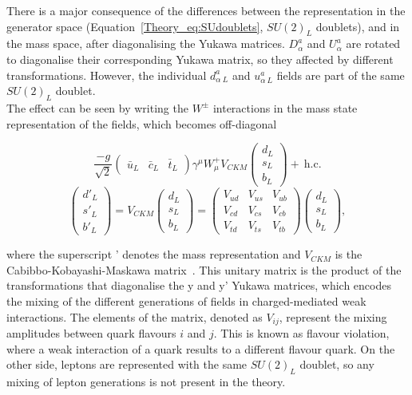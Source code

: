There is a major consequence of the differences between the representation in the generator space (Equation~\ref{Theory_eq:SUdoublets}, $SU(2)_L$ doublets), and in the mass space, after diagonalising the Yukawa matrices. $D^a_{\alpha}$ and $U^a_{\alpha}$ are rotated to diagonalise their corresponding Yukawa matrix, so they affected by different transformations. However, the individual $d^a_{\alpha\ L}$ and $u^a_{\alpha\ L}$ fields are part of the same $SU(2)_L$ doublet.\\ 

The effect can be seen by writing the $W^\pm$ interactions in the mass state representation of the fields, which becomes off-diagonal

\begin{equation}
    \frac{-g}{\sqrt{2}} \begin{pmatrix} \bar{u}_L & \bar{c}_L & \bar{t}_L \end{pmatrix} \gamma^\mu W_\mu^+ V_{CKM} \begin{pmatrix} d_L \\ s_L \\ b_L \end{pmatrix} +\ \text{h.c}.
\end{equation}
\begin{equation}
\begin{pmatrix} d'_L \\ s'_L \\ b'_L \end{pmatrix} = V_{CKM}\begin{pmatrix} d_L \\ s_L \\ b_L \end{pmatrix} =\begin{pmatrix} V_{ud} & V_{us} & V_{ub} \\ V_{cd} & V_{cs} & V_{cb} \\ V_{td} & V_{ts} & V_{tb} \end{pmatrix} \begin{pmatrix} d_L \\ s_L \\ b_L \end{pmatrix},
\end{equation}

where the superscript ' denotes the mass representation and $V_{CKM}$ is the Cabibbo-Kobayashi-Maskawa matrix~\cite{Cabibbo,KobayaMaska}. This unitary matrix is the product of the transformations that diagonalise the y and y' Yukawa matrices, which encodes the mixing of the different generations of fields in charged-mediated weak interactions. The elements of the matrix, denoted as $V_{ij}$, represent the mixing amplitudes between quark flavours $i$ and $j$. This is known as flavour violation, where a weak interaction of a quark results to a different flavour quark. %
On the other side, leptons are represented with the same $SU(2)_L$ doublet, so any mixing of lepton generations is not present in the theory.\\

